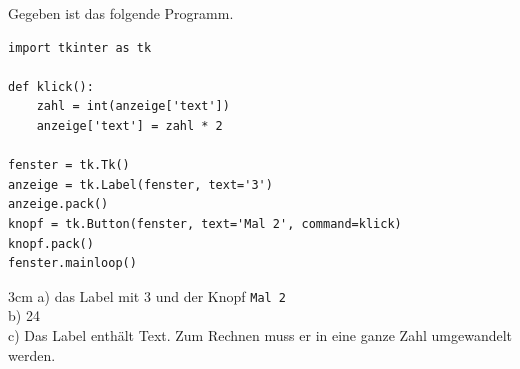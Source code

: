 \question[4]
Gegeben ist das folgende Programm.
\begin{lstlisting}
import tkinter as tk

def klick():
    zahl = int(anzeige['text'])
    anzeige['text'] = zahl * 2

fenster = tk.Tk()
anzeige = tk.Label(fenster, text='3')
anzeige.pack()
knopf = tk.Button(fenster, text='Mal 2', command=klick)
knopf.pack()
fenster.mainloop()
\end{lstlisting}
\begin{solutionbox}{3cm}
a) das Label mit 3 und der Knopf \texttt{Mal 2} \\
b) 24 \\
c) Das Label enthält Text. Zum Rechnen muss er in eine ganze Zahl umgewandelt werden.
\end{solutionbox}

